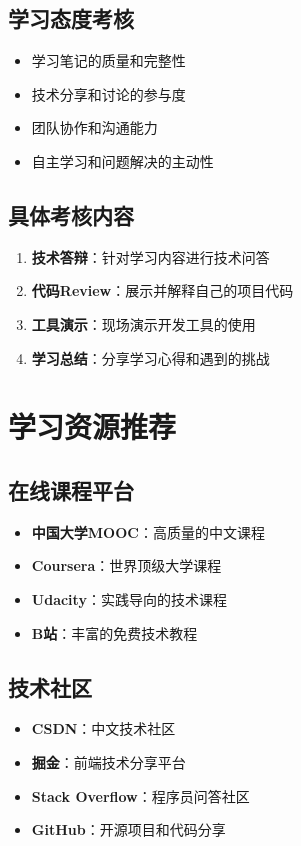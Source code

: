 \documentclass[a4paper,12pt]{article}
\begin{document}
\subsection{学习态度考核}
\begin{itemize}
    \item 学习笔记的质量和完整性
    \item 技术分享和讨论的参与度
    \item 团队协作和沟通能力
    \item 自主学习和问题解决的主动性
\end{itemize}

\subsection{具体考核内容}
\begin{enumerate}
    \item \textbf{技术答辩}：针对学习内容进行技术问答
    \item \textbf{代码Review}：展示并解释自己的项目代码
    \item \textbf{工具演示}：现场演示开发工具的使用
    \item \textbf{学习总结}：分享学习心得和遇到的挑战
\end{enumerate}

\section{学习资源推荐}

\subsection{在线课程平台}
\begin{itemize}
    \item \textbf{中国大学MOOC}：高质量的中文课程
    \item \textbf{Coursera}：世界顶级大学课程
    \item \textbf{Udacity}：实践导向的技术课程
    \item \textbf{B站}：丰富的免费技术教程
\end{itemize}

\subsection{技术社区}
\begin{itemize}
    \item \textbf{CSDN}：中文技术社区
    \item \textbf{掘金}：前端技术分享平台
    \item \textbf{Stack Overflow}：程序员问答社区
    \item \textbf{GitHub}：开源项目和代码分享
\end{itemize}
\end{document}
